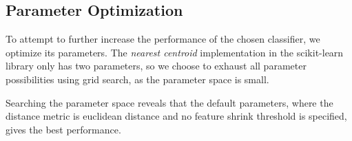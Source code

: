 
\subsection{Parameter Optimization}
To attempt to further increase the performance of the chosen classifier, we optimize its parameters. The \emph{nearest centroid} implementation in the scikit-learn library only has two parameters, so we choose to exhaust all parameter possibilities using grid search, as the parameter space is small.

Searching the parameter space reveals that the default parameters, where the distance metric is euclidean distance and no feature shrink threshold is specified, gives the best performance.

